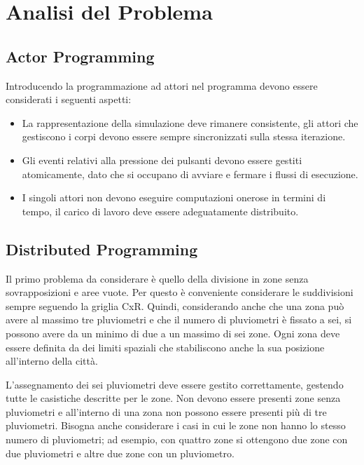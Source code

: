 \documentclass[12pt,a4paper,openright,twoside]{book}
\begin{document}
\chapter{Analisi del Problema}
\label{chap:Analisi del Problema}
\section{Actor Programming}
Introducendo la programmazione ad attori nel programma devono essere considerati i seguenti aspetti:
\begin{itemize}
	\item La rappresentazione della simulazione deve rimanere
	consistente, gli attori che gestiscono i corpi devono essere sempre sincronizzati sulla stessa iterazione.
	\item Gli eventi relativi alla pressione dei pulsanti
	devono essere gestiti atomicamente, dato che si occupano di
	avviare e fermare i flussi di esecuzione.
	\item I singoli attori non devono eseguire computazioni onerose in termini di tempo, il carico di lavoro deve essere adeguatamente distribuito.
\end{itemize}



\section{Distributed Programming}
Il primo problema da considerare è quello della divisione in zone senza sovrapposizioni e aree vuote. Per questo è conveniente considerare le suddivisioni sempre seguendo la griglia CxR. Quindi, considerando anche che una zona può avere al massimo tre pluviometri e che il numero di pluviometri è fissato a sei, si possono avere da un minimo di due a un massimo di sei zone. Ogni zona deve essere definita da dei limiti spaziali che stabiliscono anche la sua posizione all'interno della città.

L'assegnamento dei sei pluviometri deve essere gestito correttamente, gestendo tutte le casistiche descritte per le zone. Non devono essere presenti zone senza pluviometri e all'interno di una zona non possono essere presenti più di tre pluviometri. Bisogna anche considerare i casi in cui le zone non hanno lo stesso numero di pluviometri; ad esempio, con quattro zone si ottengono due zone con due pluviometri e altre due zone con un pluviometro.
\end{document}
